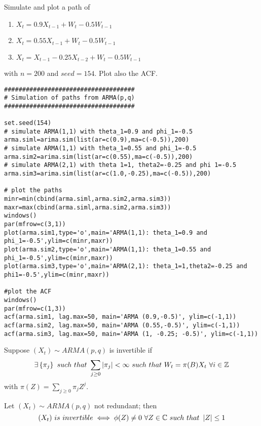 \begin{example}
    Simulate and plot a path of 
    \begin{enumerate}
        \item $X_t=0.9X_{t-1}+W_t-0.5W_{t-1}$
        \item $X_t=0.55X_{t-1}+W_t-0.5W_{t-1}$
        \item $X_t=X_{t-1}-0.25X_{t-2}+W_t-0.5W_{t-1}$
    \end{enumerate}
    with $n=200$ and $seed=154$. Plot also the ACF.
    \begin{verbatim}
#################################### 
# Simulation of paths from ARMA(p,q) 
####################################

set.seed(154)
# simulate ARMA(1,1) with theta_1=0.9 and phi_1=-0.5 
arma.siml=arima.sim(list(ar=c(0.9),ma=c(-0.5)),200)
# simulate ARMA(1,1) with theta_1=0.55 and phi_1=-0.5 
arma.sim2=arima.sim(list(ar=c(0.55),ma=c(-0.5)),200)
# simulate ARMA(2,1) with theta 1=1, theta2=-0.25 and phi 1=-0.5 
arma.sim3=arima.sim(list(ar=c(1.0,-0.25),ma=c(-0.5)),200)

# plot the paths
minr=min(cbind(arma.siml,arma.sim2,arma.sim3)) 
maxr=max(cbind(arma.siml,arma.sim2,arma.sim3)) 
windows()
par(mfrow=c(3,1))
plot(arma.sim1,type='o',main='ARMA(1,1): theta_1=0.9 and 
phi_1=-0.5',ylim=c(minr,maxr)) 
plot(arma.sim2,type='o',main='ARMA(1,1): theta_1=0.55 and 
phi_1=-0.5',ylim=c(minr,maxr)) 
plot(arma.sim3,type='o',main='ARMA(2,1): theta_1=1,theta2=-0.25 and 
phi1=-0.5',ylim=c(minr,maxr))

#plot the ACF
windows()
par(mfrow=c(1,3))
acf(arma.sim1, lag.max=50, main='ARMA (0.9,-0.5)', ylim=c(-1,1))
acf(arma.sim2, lag.max=50, main='ARMA (0.55,-0.5)', ylim=c(-1,1))
acf(arma.sim3, lag.max=50, main='ARMA (1, -0.25; -0.5)', ylim=c(-1,1))
    \end{verbatim}
\end{example}

\begin{definition}
    Suppose $(X_t)\sim ARMA(p,q)$ is invertible if 
    \[
        \exists\set{\pi_j}\ such\ that\ \sum_{j\ge0}\abs{\pi_j}<\infty\ such\ that\ W_t=\pi(B)X_t\ \forall i\in\Z
    \]
    with $\pi(Z)=\sum_{j\ge0}\pi_jZ^j$.
\end{definition}

\begin{theorem}
    Let $(X_t)\sim ARMA(p,q)$ not redundant; then
    \[
        (X_t)\ is\ invertible \iff\phi(Z)\ne0\ \forall Z\in\mathbb{C}\ such\ that\ \left|Z\right|\le1 
    \]
\end{theorem}

